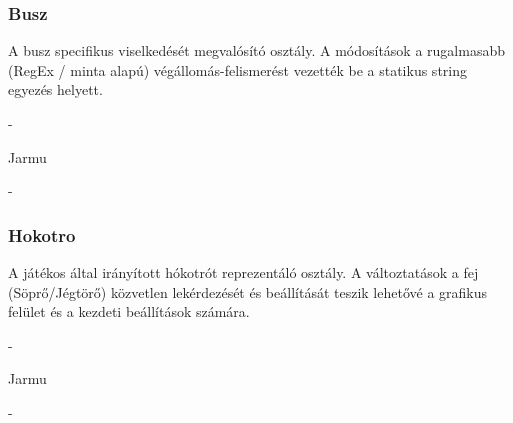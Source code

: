 \subsubsection{Busz}
\begin{class-template-responsibility}
    A busz specifikus viselkedését megvalósító osztály. A módosítások a rugalmasabb (RegEx / minta alapú) végállomás-felismerést vezették be a statikus string egyezés helyett.
\end{class-template-responsibility}
\begin{class-template-interface}
    -
\end{class-template-interface}
\begin{class-template-baseclass}
    Jarmu
\end{class-template-baseclass}
\begin{class-template-attribute}
    -
\end{class-template-attribute}
\begin{class-template-method}
\end{class-template-method}

\subsubsection{Hokotro}
\begin{class-template-responsibility}
    A játékos által irányított hókotrót reprezentáló osztály. A változtatások a fej (Söprő/Jégtörő) közvetlen lekérdezését és beállítását teszik lehetővé a grafikus felület és a kezdeti beállítások számára.
\end{class-template-responsibility}
\begin{class-template-interface}
    -
\end{class-template-interface}
\begin{class-template-baseclass}
    Jarmu
\end{class-template-baseclass}
\begin{class-template-attribute}
    -
\end{class-template-attribute}
\begin{class-template-method}
\end{class-template-method}

